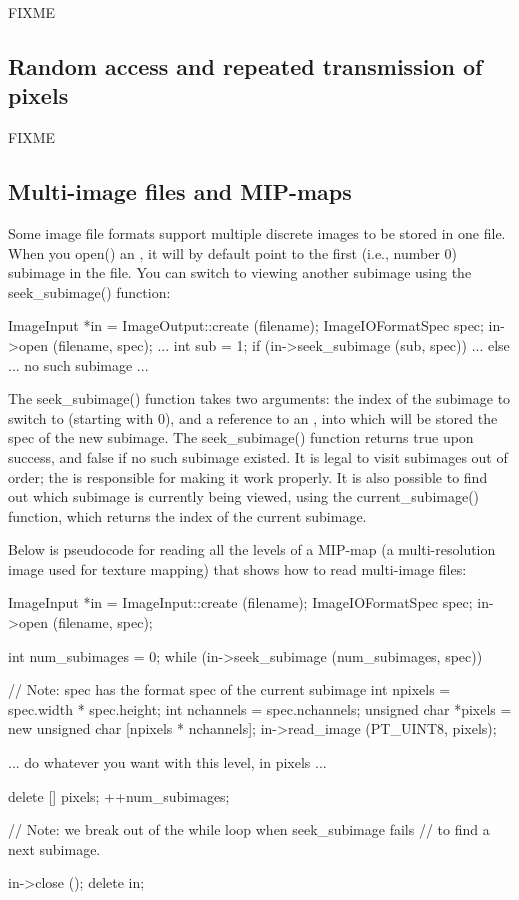 FIXME


\subsection{Random access and repeated transmission of pixels}
\label{sec:imageinput:randomrepeated}

FIXME


\subsection{Multi-image files and MIP-maps}
\label{sec:imageinput:multiimage}

Some image file formats support multiple discrete images to be stored
in one file.  When you {\cf open()} an \ImageOutput, it will by default
point to the first (i.e., number 0) subimage in the file.  You can
switch to viewing another subimage using the {\cf seek_subimage()} 
function:

\begin{code}
        ImageInput *in = ImageOutput::create (filename);
        ImageIOFormatSpec spec;
        in->open (filename, spec);
        ...
        int sub = 1;
        if (in->seek_subimage (sub, spec)) {
            ...
        } else {
            ... no such subimage ...
        }
\end{code}

The {\cf seek_subimage()} function takes two arguments: the index of the
subimage to switch to (starting with 0), and a reference to an
\ImageIOFormatSpec, into which will be stored the spec of the new
subimage.  The {\cf seek_subimage()} function returns {\cf true} upon
success, and {\cf false} if no such subimage existed.  It is legal to
visit subimages out of order; the \ImageInput is responsible for making
it work properly.  It is also possible to find out which subimage is
currently being viewed, using the {\cf current_subimage()} function,
which returns the index of the current subimage.

Below is pseudocode for reading all the levels of a MIP-map (a
multi-resolution image used for texture mapping) that shows how to read
multi-image files:

\begin{code}
        ImageInput *in = ImageInput::create (filename);
        ImageIOFormatSpec spec;
        in->open (filename, spec);

        int num_subimages = 0;
        while (in->seek_subimage (num_subimages, spec)) {
            // Note: spec has the format spec of the current subimage
            int npixels = spec.width * spec.height;
            int nchannels = spec.nchannels;
            unsigned char *pixels = new unsigned char [npixels * nchannels];
            in->read_image (PT_UINT8, pixels);

            ... do whatever you want with this level, in pixels ...

            delete [] pixels;
            ++num_subimages;
        }
        // Note: we break out of the while loop when seek_subimage fails
        // to find a next subimage.

        in->close ();
        delete in;
\end{code}

